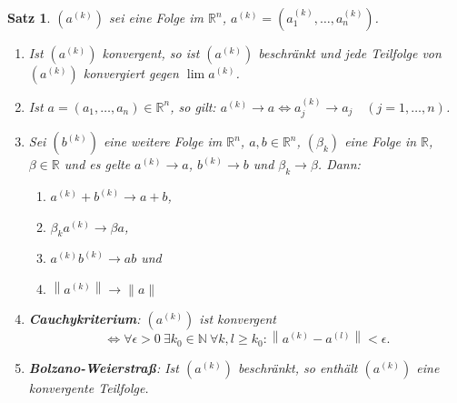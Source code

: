\documentclass[12pt]{extreport} %
\newcommand{\N}{\mathbb{N}}
\newcommand{\R}{\mathbb{R}}
\theoremstyle{named}
\theoremstyle{nnamed}
\theoremstyle{itshape}
\newtheorem{satz}[unnamedtheorem]{Satz}
\theoremstyle{normal}
\begin{document}
\begin{satz} \label{15.1:satz}
	$\left( a^{(k)} \right)$ sei eine Folge im $\R^{n}$, $a^{(k)} = \left( a_{1}^{(k)}, \dotsc, a_{n}^{(k)}\right)$.
	
	\begin{enumerate}
		\item Ist $\left( a^{(k)} \right)$ konvergent, so ist $\left( a^{(k)} \right)$ beschränkt und jede Teilfolge von $\left( a^{(k)} \right)$ konvergiert gegen $\lim a^{(k)}$.
		\item Ist $a = \left( a_{1}, \dotsc, a_{n} \right) \in \R^{n}$, so gilt: $a^{(k)} \longrightarrow a \iff a_{j}^{(k)} \longrightarrow a_{j} \quad (j = 1, \dotsc, n)$.
		\item Sei $\left( b^{(k)}\right)$ eine weitere Folge im $\R^{n}$, $a, b \in \R^{n}$, $(\beta_{k})$ eine Folge in $\R$, $\beta \in \R$ und es gelte $a^{(k)} \longrightarrow a$, $b^{(k)} \longrightarrow b$ und $\beta_{k} \longrightarrow \beta$. Dann:
			\begin{enumerate}
				\item $a^{(k)} + b^{(k)} \longrightarrow a + b$,
				\item $\beta_{k} a^{(k)} \longrightarrow \beta a$,
				\item $a^{(k)} b^{(k)} \longrightarrow a b$ und
				\item $\left\| a^{(k)} \right\| \longrightarrow \| a \|$
			\end{enumerate}
		\item \textbf{Cauchykriterium}: $\left( a^{(k)}\right)$ ist konvergent 
			\[ \iff \forall \epsilon > 0 ~\exists k_{0} \in \N ~\forall k, l \geq k_{0}: \left\| a^{(k)} - a^{(l)} \right\| < \epsilon. \]
		\item \textbf{Bolzano-Weierstra{\ss}}: Ist $\left( a^{(k)} \right)$ beschränkt, so enthält $\left( a^{(k)} \right)$ eine konvergente Teilfolge.
	\end{enumerate}
	

\end{satz}
\end{document}
